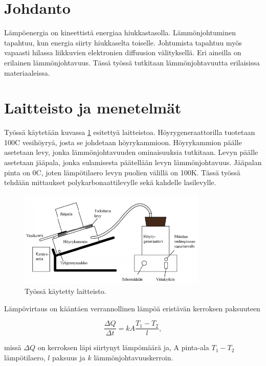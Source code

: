 \documentclass[a4paper,11pt]{article}
\begin{document}
\section{Johdanto}

Lämpöenergia on kineettistä energiaa hiukkastasolla. Lämmönjohtuminen tapahtuu, kun energia siirty hiukkaselta toiselle. Johtumista tapahtuu myös vapaasti hilassa liikkuvien elektronien diffuusion välityksellä. Eri aineilla on erilainen lämmönjohtavuus. Tässä työssä tutkitaan lämmönjohtavuutta erilaisissa materiaaleissa. \cite{wiki:thermal}

\section{Laitteisto ja menetelmät}

Työssä käytetään kuvassa \ref{laitteisto} esitettyä laitteistoa. Höyrygeneraattorilla tuotetaan 100\degree C vesihöyryä, josta se johdetaan höyrykammioon. Höyrykammion päälle asetetaan levy, jonka lämmönjohtavuuden ominaisuuksia tutkitaan. Levyn päälle asetetaan jääpala, jonka sulamisesta päätellään levyn lämmönjohtavuus. Jääpalan pinta on 0\degree C, joten lämpötilaero levyn puolien välillä on 100K. Tässä työssä tehdään mittaukset polykarbonaattilevylle sekä kahdelle lasilevylle. 

\begin{figure}[H]
\centering \includegraphics[width=0.8\textwidth]{laitteisto}
\caption{Työssä käytetty laitteisto. \label{laitteisto}}
\end{figure}

Lämpövirtaus on kääntäen verrannollinen lämpöä eristävän kerroksen paksuuteen

\begin{equation}
  \label{lampovirtaus}
  \frac{\Delta Q}{\Delta t} = k A \frac{T_1 - T_2}{l} ,
\end{equation}

missä $\Delta Q$ on kerroksen läpi siirtynyt lämpömäärä ja, A pinta-ala $T_1 - T_2$ lämpötilaero, $l$ paksuus ja $k$ lämmönjohtavuuskerroin. 
\end{document}
